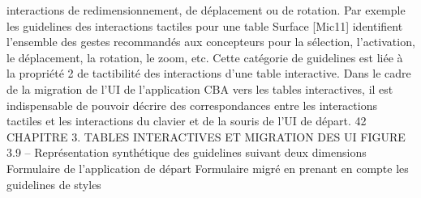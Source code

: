 \documentclass{article}
\begin{document}
interactions de redimensionnement, de d\'{e}placement ou de rotation. Par exemple les guidelines des interactions tactiles pour une table Surface [Mic11] identiﬁent l’ensemble des gestes recommand\'{e}s aux
concepteurs pour la s\'{e}lection, l’activation, le d\'{e}placement, la rotation, le zoom, etc. Cette cat\'{e}gorie
de guidelines est li\'{e}e \`{a} la propri\'{e}t\'{e} 2 de tactibilit\'{e} des interactions d’une table interactive.
Dans le cadre de la migration de l’UI de l’application CBA vers les tables interactives, il est
indispensable de pouvoir d\'{e}crire des correspondances entre les interactions tactiles et les interactions
du clavier et de la souris de l’UI de d\'{e}part.
42
CHAPITRE 3. TABLES INTERACTIVES ET MIGRATION DES UI
FIGURE 3.9 – Repr\'{e}sentation synth\'{e}tique des guidelines suivant deux dimensions
Formulaire de l’application de d\'{e}part
Formulaire migr\'{e} en prenant en compte les
guidelines de styles
 
\end{document}
